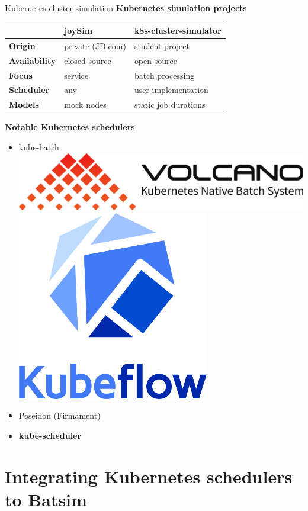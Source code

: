 \documentclass[12pt, aspectratio=43]{beamer}
\begin{document}
\begin{frame}{Kubernetes cluster simulation}
	\centering
	\textbf{Kubernetes simulation projects}
	\begin{adjustbox}{width=0.8\textwidth}
		\begin{tabular}{lll}
			\hline
			& \textbf{joySim} & \textbf{k8s-cluster-simulator} \\
			\hline\hline
			\textbf{Origin} & private (JD.com) & student project\\
			\textbf{Availability} & closed source & open source\\
			\textbf{Focus} & service & batch processing\\
			\textbf{Scheduler} & any & user implementation\\
			\textbf{Models} & mock nodes & static job durations\\
			\hline
		\end{tabular}
	\end{adjustbox}
	
	\vspace{1ex}
	\textbf{Notable Kubernetes schedulers}
	\begin{itemize}
		\item kube-batch\\
			\smallskip
			\includegraphics[width=13ex]{../imgs/volcano-logo.png}\hspace{1ex}
			\includegraphics[width=6ex]{../imgs/kubeflow-logo.png}
		\item Poseidon (Firmament)
		\item \textbf{kube-scheduler}
	\end{itemize}
\end{frame}

\section{Integrating Kubernetes schedulers to Batsim}
\end{document}
